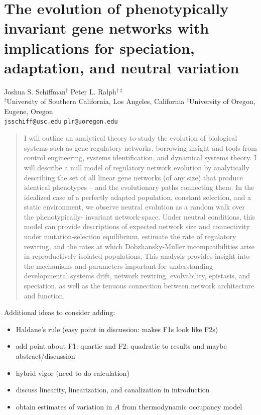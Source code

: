 \documentclass[9 pt]{article}
\newcommand{\1}{\mathbbm{1}}
\begin{document}
\section*{The evolution of phenotypically invariant gene networks with implications for speciation, adaptation, and neutral variation}
{\centering
Joshua S. Schiffman$^{\dagger}$ \qquad Peter L. Ralph$^{\dagger \ddagger}$ \\
$^{\dagger}$University of Southern California, Los Angeles, California \qquad $^{\ddagger}$University of Oregon, Eugene, Oregon \\
\texttt{jsschiff@usc.edu} \qquad \texttt{plr@uoregon.edu}
\\
}



\begin{abstract}
I will outline an analytical theory to study the evolution of biological systems such as gene regulatory networks, borrowing insight and tools from control engineering, systems identification, and dynamical systems theory. I will describe a null model of regulatory network evolution by analytically describing the set of all linear gene networks (of any size) that produce identical phenotypes -- and the evolutionary paths connecting them. In the idealized case of a perfectly adapted population, constant selection, and a static environment, we observe neutral evolution as a random walk over the phenotypically- invariant network-space. Under neutral conditions, this model can provide descriptions of expected network size and connectivity under mutation-selection equilibrium, estimate the rate of regulatory rewiring, and the rates at which Dobzhansky-Muller incompatibilities arise in reproductively isolated populations. This analysis provides insight into the mechanisms and parameters important for understanding developmental systems drift, network rewiring, evolvability, epistasis, and speciation, as well as the tenuous connection between network architecture and function. 
\end{abstract}

Additional ideas to consider adding:
\begin{itemize}
    \item Haldane's rule (easy point in discussion: makes F1s look like F2s)
    \item add point about F1: quartic and F2: quadratic to results and maybe abstract/discussion
    \item hybrid vigor (need to do calculation)
    \item discuss linearity, linearization, and canalization in introduction
    \item obtain estimates of variation in $A$ from thermodynamic occupancy model
\end{itemize}
\end{document}

